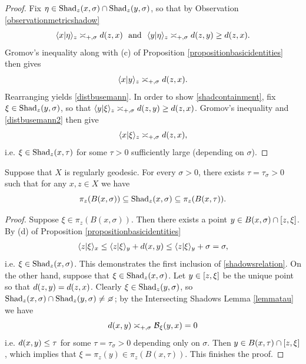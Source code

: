 \begin{proof}
Fix $\eta\in\operatorname{Shad}_z(x,\sigma)\cap \operatorname{Shad}_z(y,\sigma)$, so that by Observation \ref{observationmetricshadow}
\[
\langle x|\eta\rangle_z \asymp_{+,\sigma} d(z,x)\ \textup{ and } \
\langle y|\eta\rangle_z \asymp_{+,\sigma} d(z,y) \geq d(z,x).
\]
Gromov's inequality along with (c) of Proposition \ref{propositionbasicidentities} then gives
\begin{equation}\label{distbusemann2}
\langle x|y\rangle_z \asymp_{+,\sigma} d(z,x).
\end{equation}
Rearranging yields \eqref{distbusemann}. In order to show \eqref{shadcontainment}, fix $\xi\in\operatorname{Shad}_z(y,\sigma)$, so that $\langle y|\xi\rangle_z \asymp_{+,\sigma} d(z,y)\geq d(z,x)$. Gromov's inequality and \eqref{distbusemann2} then give
\[
\langle x|\xi\rangle_z \asymp_{+,\sigma} d(z,x),
\]
i.e. $\xi\in\operatorname{Shad}_z(x,\tau)$ for some $\tau > 0$ sufficiently large (depending on $\sigma$).
\end{proof}

\begin{corollary}
\label{corollaryshadowsrelation}
Suppose that $X$ is regularly geodesic. For every $\sigma > 0$, there exists $\tau = \tau_\sigma > 0$ such that for any $x,z\in X$ we have
\begin{equation}
\label{shadowsrelation}
\pi_z(B(x,\sigma)) \subseteq \operatorname{Shad}_z(x,\sigma) \subseteq \pi_z(B(x,\tau)).
\end{equation}
\end{corollary}
\begin{proof}
Suppose $\xi\in\pi_z(B(x,\sigma))$. Then there exists a point $y\in B(x,\sigma)\cap [z,\xi]$. By (d) of Proposition \ref{propositionbasicidentities}
\begin{align*}
\langle z|\xi\rangle_x \leq \langle z|\xi\rangle_y + d(x,y)
\leq \langle z|\xi\rangle_y + \sigma = \sigma,
\end{align*}
i.e. $\xi\in\operatorname{Shad}_z(x,\sigma)$. This demonstrates the first inclusion of \eqref{shadowsrelation}. On the other hand, suppose that $\xi\in\operatorname{Shad}_z(x,\sigma)$. Let $y\in[z,\xi]$ be the unique point so that $d(z,y) = d(z,x)$. Clearly $\xi\in\operatorname{Shad}_z(y,\sigma)$, so $\Shad_z(x,\sigma)\cap\Shad_z(y,\sigma)\neq\emptyset$; by the Intersecting Shadows Lemma \ref{lemmatau} we have
\[
d(x,y) \asymp_{+,\sigma} \operatorname{\mathcal B}_\xi(y,x) = 0
\]
i.e. $d(x,y)\leq\tau$ for some $\tau = \tau_\sigma > 0$ depending only on $\sigma$. Then $y\in B(x,\tau)\cap[z,\xi]$, which implies that $\xi = \pi_z(y)\in \pi_z(B(x,\tau))$. This finishes the proof.
\end{proof}

